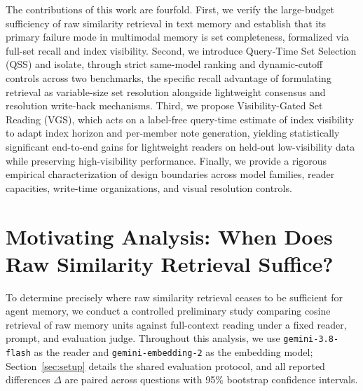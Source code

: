 \documentclass[10pt]{article}
\newcommand{\qss}{QSS}
\begin{document}
The contributions of this work are fourfold. First, we verify the large-budget sufficiency of raw similarity retrieval in text memory and establish that its primary failure mode in multimodal memory is set completeness, formalized via full-set recall and index visibility. Second, we introduce Query-Time Set Selection (\qss{}) and isolate, through strict same-model ranking and dynamic-cutoff controls across two benchmarks, the specific recall advantage of formulating retrieval as variable-size set resolution alongside lightweight consensus and resolution write-back mechanisms. Third, we propose Visibility-Gated Set Reading (VGS), which acts on a label-free query-time estimate of index visibility to adapt index horizon and per-member note generation, yielding statistically significant end-to-end gains for lightweight readers on held-out low-visibility data while preserving high-visibility performance. Finally, we provide a rigorous empirical characterization of design boundaries across model families, reader capacities, write-time organizations, and visual resolution controls.

\section{Motivating Analysis: When Does Raw Similarity Retrieval Suffice?}
\label{sec:prelim}

To determine precisely where raw similarity retrieval ceases to be sufficient for agent memory, we conduct a controlled preliminary study comparing cosine retrieval of raw memory units against full-context reading under a fixed reader, prompt, and evaluation judge. Throughout this analysis, we use \texttt{gemini-3.8-flash} as the reader and \texttt{gemini-embedding-2} as the embedding model; Section~\ref{sec:setup} details the shared evaluation protocol, and all reported differences $\Delta$ are paired across questions with 95\% bootstrap confidence intervals.
\end{document}
